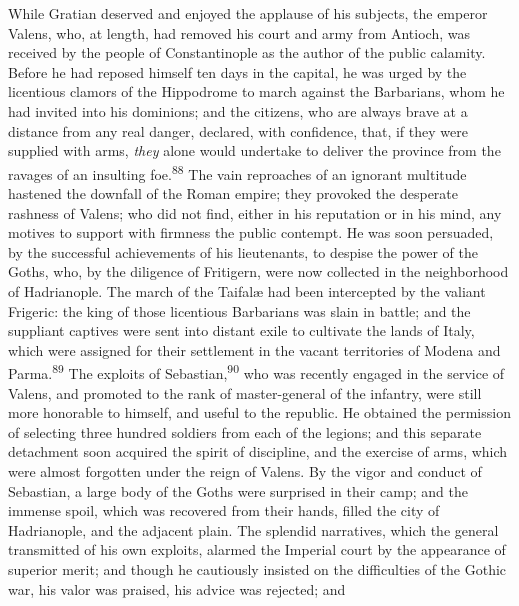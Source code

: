 
While Gratian deserved and enjoyed the applause of his subjects,
the emperor Valens, who, at length, had removed his court and
army from Antioch, was received by the people of Constantinople
as the author of the public calamity. Before he had reposed
himself ten days in the capital, he was urged by the licentious
clamors of the Hippodrome to march against the Barbarians, whom
he had invited into his dominions; and the citizens, who are
always brave at a distance from any real danger, declared, with
confidence, that, if they were supplied with arms, \textit{they} alone
would undertake to deliver the province from the ravages of an
insulting foe.\textsuperscript{88} The vain reproaches of an ignorant multitude
hastened the downfall of the Roman empire; they provoked the
desperate rashness of Valens; who did not find, either in his
reputation or in his mind, any motives to support with firmness
the public contempt. He was soon persuaded, by the successful
achievements of his lieutenants, to despise the power of the
Goths, who, by the diligence of Fritigern, were now collected in
the neighborhood of Hadrianople. The march of the Taifalæ had
been intercepted by the valiant Frigeric: the king of those
licentious Barbarians was slain in battle; and the suppliant
captives were sent into distant exile to cultivate the lands of
Italy, which were assigned for their settlement in the vacant
territories of Modena and Parma.\textsuperscript{89} The exploits of Sebastian,\textsuperscript{90}
who was recently engaged in the service of Valens, and promoted
to the rank of master-general of the infantry, were still more
honorable to himself, and useful to the republic. He obtained the
permission of selecting three hundred soldiers from each of the
legions; and this separate detachment soon acquired the spirit of
discipline, and the exercise of arms, which were almost forgotten
under the reign of Valens. By the vigor and conduct of Sebastian,
a large body of the Goths were surprised in their camp; and the
immense spoil, which was recovered from their hands, filled the
city of Hadrianople, and the adjacent plain. The splendid
narratives, which the general transmitted of his own exploits,
alarmed the Imperial court by the appearance of superior merit;
and though he cautiously insisted on the difficulties of the
Gothic war, his valor was praised, his advice was rejected; and

